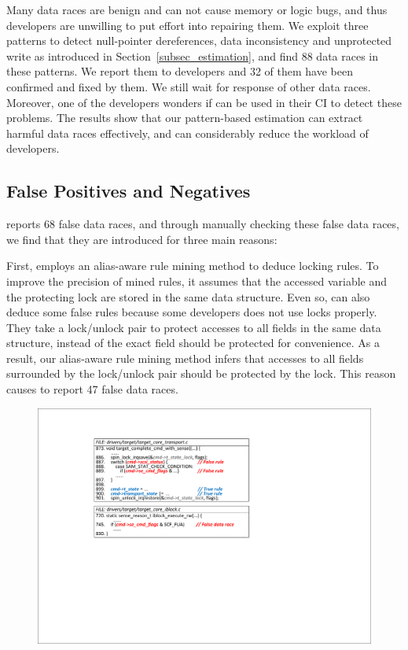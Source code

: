  Many data races are benign and can not cause memory 
or logic bugs, and thus developers are unwilling to put effort into repairing 
them. We exploit three patterns to detect null-pointer dereferences, data 
inconsistency and unprotected write as introduced in 
Section~\ref{subsec_estimation}, and find 88 data races in these patterns. We 
report them to developers and 32 of them have been confirmed and fixed by them. 
We still wait for response of other data races. Moreover, one of the developers 
wonders if \sys can be used in their CI to detect these problems. 
The results show that our pattern-based estimation can extract harmful data 
races effectively, and can considerably reduce the workload of developers.

\subsection{False Positives and Negatives}
\label{subsec_false_pos_neg}
 \sys reports 68 false data races, and through manually 
checking these false data races, we find that they are introduced for three 
main reasons:

First, \sys employs an alias-aware rule mining method to deduce locking rules. 
To improve the precision of mined rules, it assumes that the accessed variable 
and the protecting lock are stored in the same data structure. Even so, \sys 
can also deduce some false rules because some developers does not use locks 
properly. They take a lock/unlock pair to protect accesses to all fields in the 
same data structure, instead of the exact field should be protected for 
convenience. As a result, our alias-aware rule mining method infers that 
accesses to all fields surrounded by the lock/unlock pair should be protected 
by the lock. This reason causes \sys to report 47 false data races.

\begin{figure}[htbp]
	\centering
	\includegraphics[width=1\linewidth]{figures/fig_demo_false_rule.pdf}
	\label{fig_demo_false_rule}
\end{figure}

